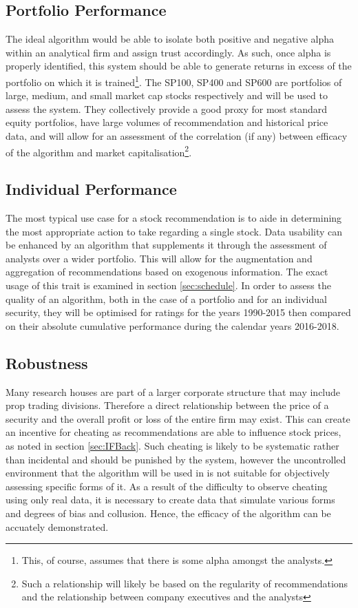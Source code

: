 \subsection{Portfolio Performance}
The ideal algorithm would be able to isolate both positive and negative alpha within an analytical firm and assign trust accordingly. As such, once alpha is properly identified, this system should be able to generate returns in excess of the portfolio on which it is trained\footnote{This, of course, assumes that there is some alpha amongst the analysts.}. The SP100, SP400 and SP600 are portfolios of large, medium, and small market cap stocks respectively and will be used to assess the system. They collectively provide a good proxy for most standard equity portfolios, have large volumes of recommendation and historical price data, and will allow for an assessment of the correlation (if any) between efficacy of the algorithm and market capitalisation\footnote{Such a relationship will likely be based on the regularity of recommendations and the relationship between company executives and the analysts}.


\subsection{Individual Performance}
The most typical use case for a stock recommendation is to aide in determining the most appropriate action to take regarding a single stock. Data usability can be enhanced by an algorithm that supplements it through the assessment of analysts over a wider portfolio. This will allow for the augmentation and aggregation of recommendations based on exogenous information. The exact usage of this trait is examined in section \ref{sec:schedule}. In order to assess the quality of an algorithm, both in the case of a portfolio and for an individual security, they will be optimised for ratings for the years 1990-2015 then compared on their absolute cumulative performance during the calendar years 2016-2018. 

\subsection{Robustness}
Many research houses are part of a larger corporate structure that may include prop trading divisions. Therefore a direct relationship between the price of a security and the overall profit or loss of the entire firm may exist. This can create an incentive for cheating as recommendations are able to influence stock prices, as noted in section \ref{sec:IFBack}. Such cheating is likely to be systematic rather than incidental and should be punished by the system, however the uncontrolled environment that the algorithm will be used in is not suitable for objectively assessing specific forms of it. 
As a result of the difficulty to observe cheating using only real data, it is necessary to create data that simulate various forms and degrees of bias and collusion. Hence, the efficacy of the algorithm can be accuately demonstrated.

